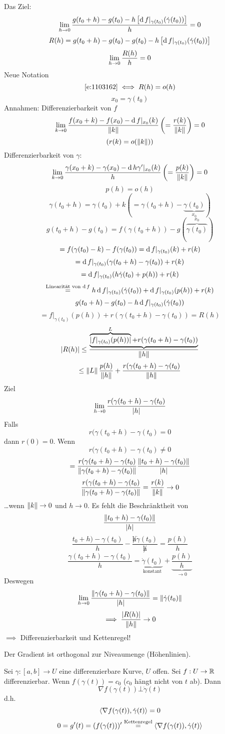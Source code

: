 \begin{Bew}
  Das Ziel:
  \[\displaystyle\lim_{h\rightarrow0} \frac{g(t_0+h)-g(t_0)-h\left[ \operatorname{d} f|_{\gamma(t_0)}(\dot\gamma(t_0)) \right]}{h}=0\]
  \begin{equation}
    \label{e:1103161}
    R(h)=g(t_0+h)-g(t_0)-g(t_0)-h\left[ \operatorname{d} f|_{\gamma(t_0)}(\dot\gamma(t_0)) \right]
  \end{equation}
  \begin{equation}
    \label{e:1103162}
    \displaystyle\lim_{h\rightarrow0}\frac{R(h)}{h}=0
  \end{equation}
  Neue Notation
  \[\ref{e:1103162}\iff R(h)=o(h)\]
  \[x_0=\gamma(t_0)\]
  Annahmen: Differenzierbarkeit von $f$
  \[\displaystyle\lim_{k\rightarrow0}\frac{f(x_0+k)-f(x_0)-\operatorname{d} f|_{x_0}(k)}{\left\| k \right\|}\left( =\frac{r(k)}{\left\| k \right\|} \right)=0\]
  \[\left( r(k)=o(\left\| k \right\|) \right)\]
  Differenzierbarkeit von $\gamma$:
  \[\displaystyle\lim_{k\rightarrow0}\frac{\gamma(x_0+k)-\gamma(x_0)-\operatorname{d} h\gamma'|_{x_0}(k)}{h}\left( =\frac{p(k)}{\left\| k \right\|} \right)=0\]
  \[p(h)=o(h)\]
  \[\gamma(t_0+h)=\gamma(t_0)+k\left( =\gamma(t_0+h)-\underbrace{\gamma(t_0)}_{x_0} \right)\]
  \[g(t_0+h)-g(t_0)=f(\gamma(t_0+h))-g(\overbrace{\gamma(t_0)}^{x_0})\]
  \[=f(\gamma(t_0)-k)-f(\gamma(t_0))=\operatorname{d} f|_{\gamma(t_0)}(k)+r(k)\]
  \[=\operatorname{d} f|_{\gamma(t_0)}(\gamma(t_0+h)-\gamma(t_0))+r(k)\]
  \[=\operatorname{d} f|_{\gamma(t_0)}(h\dot\gamma(t_0)+p(h))+r(k)\]
  \[\stackrel{\text{Linearität von $\operatorname{d} f$}}{=}h\operatorname{d} f|_{\gamma(t_0)}(\dot\gamma(t_0))+\operatorname{d} f|_{\gamma(t_0)}(p(h))+r(k)\]
  \[g(t_0+h)-g(t_0)-h\operatorname{d} f|_{\gamma(t_0)}(\dot\gamma(t_0))\]
  \[=f|_{\gamma(t_0)}(p(h))+r(\gamma(t_0+h)-\gamma(t_0))=R(h)\]
  \[\mathopen| R(h) \mathclose|\leq \frac{\underbrace{\overbrace{\mathopen| f|_{\gamma(t_0)}(p(h)) \mathclose|}^{L}+r(\gamma(t_0+h)-\gamma(t_0))}}{\left\| h \right\|}\]
  \[\leq\left\| L \right\|\frac{p(h)}{\left\| h \right\|}+\frac{r(\gamma(t_0+h)-\gamma(t_0)}{\left\| h \right\|}\]
  Ziel
  \[\displaystyle\lim_{h\rightarrow0}\frac{r(\gamma(t_0+h)-\gamma(t_0)}{\mathopen| h \mathclose|}\]
  Falls 
  \[r(\gamma(t_0+h)-\gamma(t_0)=0\]
  dann $r(0)=0$. Wenn 
  \[r(\gamma(t_0+h)-\gamma(t_0)\neq 0\]
  \[=\frac{r(\gamma(t_0+h)-\gamma(t_0)}{\left\| \gamma(t_0+h)-\gamma(t_0) \right\|}\frac{\left\| t_0+h)-\gamma(t_0) \right\|}{\mathopen| h \mathclose|}\]
  \[\frac{r(\gamma(t_0+h)-\gamma(t_0)}{\left\| \gamma(t_0+h)-\gamma(t_0) \right\|}=\frac{r(k)}{\left\| k \right\|}\rightarrow 0\]
  \ldots wenn $\left\| k \right\|\rightarrow 0$ und $h\to 0$. Es fehlt die Beschränktheit von
  \[\frac{\left\| t_0+h)-\gamma(t_0) \right\|}{\mathopen| h \mathclose|}\]
  \[\frac{t_0+h)-\gamma(t_0)}{h}-\frac{\not h\dot \gamma(t_0)}{\not h}=\frac{p(h)}{h}\]
  \[\frac{\gamma(t_0+h)-\gamma(t_0)}{h}=\underbrace{\dot\gamma(t_0)}_{\text{konstant}}+\underbrace{\frac{p(h)}{h}}_{\to 0}\]
  Deswegen
  \[\displaystyle\lim_{h\rightarrow0}\frac{\left\| \gamma(t_0+h)-\gamma(t_0) \right\|}{\mathopen| h \mathclose|}=\left\| \dot\gamma(t_0) \right\|\]
  \[\implies \frac{\mathopen| R(h) \mathclose|}{\left\| h \right\|}\rightarrow 0\]
  $\implies$ Differenzierbarkeit und Kettenregel!
\end{Bew}
\begin{Bem}
  Der Gradient ist orthogonal zur Niveaumenge (Höhenlinien).
\end{Bem}
\begin{Def}
  Sei $\gamma:[a,b]\to U$ eine differenzierbare Kurve, $U$ offen. Sei $f:U\rightarrow\mathbb{R}$ differenzierbar. Wenn $f(\gamma(t))=c_0$ ($c_0$ hängt nicht von $t$ ab). Dann
  \[\nabla f(\gamma(t))\bot \dot\gamma(t)\]
  d.h.
  \[\langle \nabla f(\gamma(t)), \dot\gamma(t)  \rangle=0\]
  \[0=g'(t)=(f(\gamma(t)))'\stackrel{\text{Kettenregel}}{=}\langle \nabla f(\gamma(t)), \dot\gamma(t) \rangle\]
\end{Def}
